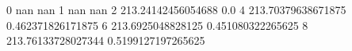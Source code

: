 0 nan nan
1 nan nan
2 213.24142456054688 0.0
4 213.70379638671875 0.462371826171875
6 213.6925048828125 0.451080322265625
8 213.76133728027344 0.5199127197265625
